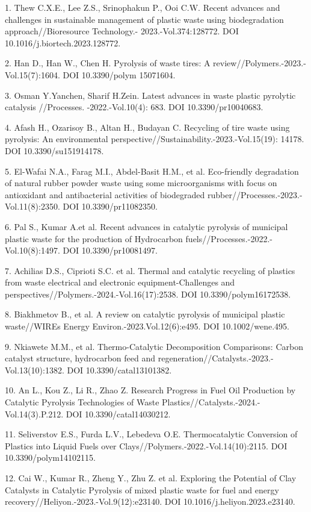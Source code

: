 \begin{refs}
1. Thew C.X.E., Lee Z.S., Srinophakun P., Ooi C.W. Recent advances and
challenges in sustainable management of plastic waste using
biodegradation approach//Bioresource Technology.-
2023.-Vol.374:128772.  DOI 10.1016/j.biortech.2023.128772.

2. Han D., Han W., Chen H. Pyrolysis of waste tires: A
review//Polymers.-2023.-Vol.15(7):1604. DOI 10.3390/polym 15071604.

3. Osman Y.Yanchen, Sharif H.Zein. Latest advances in waste plastic
pyrolytic catalysis //Processes. -2022.-Vol.10(4): 683. DOI
10.3390/pr10040683.

4. Afash H., Ozarisoy B., Altan H., Budayan C. Recycling of tire waste
using pyrolysis: An environmental
perspective//Sustainability.-2023.-Vol.15(19): 14178. DOI
10.3390/su151914178.

5. El-Wafai N.A., Farag M.I., Abdel-Basit H.M., et al. Eco-friendly
degradation of natural rubber powder waste using some microorganisms
with focus on antioxidant and antibacterial activities of biodegraded
rubber//Processes.-2023.-Vol.11(8):2350. DOI 10.3390/pr11082350.

6. Pal S., Kumar A.et al. Recent advances in catalytic pyrolysis of
municipal plastic waste for the production of Hydrocarbon
fuels//Processes.-2022.-Vol.10(8):1497. DOI 10.3390/pr10081497.

7. Achilias D.S., Ciprioti S.C. et al. Thermal and catalytic recycling
of plastics from waste electrical and electronic equipment-Challenges
and perspectives//Polymers.-2024.-Vol.16(17):2538. DOI
10.3390/polym16172538.

8. Biakhmetov B., et al. A review on catalytic pyrolysis of municipal
plastic waste//WIREs Energy Environ.-2023.Vol.12(6):e495. DOI
10.1002/wene.495.

9. Nkiawete M.M., et al. Thermo-Catalytic Decomposition Comparisons:
Carbon catalyst structure, hydrocarbon feed and
regeneration//Catalysts.-2023.-Vol.13(10):1382. DOI
10.3390/catal13101382.

10. An L., Kou Z., Li R., Zhao Z. Research Progress in Fuel Oil
Production by Catalytic Pyrolysis Technologies of Waste
Plastics//Catalysts.-2024.-Vol.14(3).P.212. DOI 10.3390/catal14030212.

11. Seliverstov E.S., Furda L.V., Lebedeva O.E. Thermocatalytic
Conversion of Plastics into Liquid Fuels over
Clays//Polymers.-2022.-Vol.14(10):2115. DOI 10.3390/polym14102115.

12. Cai W., Kumar R., Zheng Y., Zhu Z. et al. Exploring the Potential
of Clay Catalysts in Catalytic Pyrolysis of mixed plastic waste for
fuel and energy recovery//Heliyon.-2023.-Vol.9(12):e23140. DOI
10.1016/j.heliyon.2023.e23140.


\end{refs}
